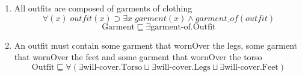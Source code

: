 \documentclass[paper=a4, fontsize=11pt]{scrartcl} %
\numberwithin{equation}{section} %
\numberwithin{figure}{section} %
\numberwithin{table}{section} %
\begin{document}
\begin{enumerate}

\item All outfits are composed of garments of clothing
\begin{equation*}
	\forall(x) \; outfit(x) \supset \exists x \; garment(x) \land garment\_of(outfit)
\end{equation*}
\begin{equation*}
	\text{Garment} \sqsubseteq \exists \text{garment-of.Outfit}
\end{equation*}

\item An outfit must contain some garment that wornOver the legs, some garment that wornOver the feet and some garment that wornOver the torso
\begin{equation*}
	\text{Outfit} \sqsubseteq \forall (\exists \text{will-cover.Torso} \sqcup \exists \text{will-cover.Legs} \sqcup \exists \text{will-cover.Feet})
\end{equation*}

\end{enumerate}
\end{document}
